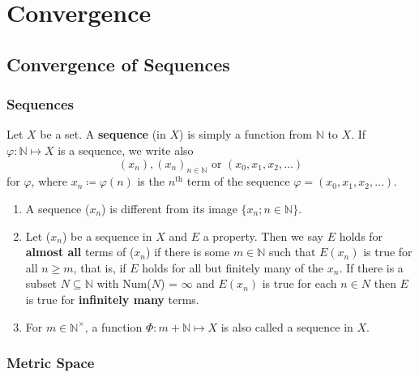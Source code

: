 \part{Convergence}
\chapter{Convergence of Sequences}

\section{Sequences}

\begin{definition}[Sequence]\label{def: sequence}
    Let \(X\) be a set. A \textbf{sequence} (in \(X\)) is simply a function from
    \(\mathbb{N}\) to \(X\). If \(\varphi \colon \mathbb{N} \mapsto X\) is a sequence,
    we write also
    \[
        (x_n), (x_n)_{n\in \mathbb{N}} \text{ or } (x_0,x_1,x_2,\ldots)  
    \]
    for \(\varphi\), where \(x_n \coloneqq \varphi\left(n\right)\) is the \(n^{\text{th}}\)
    term of the sequence \(\varphi = \left(x_0, x_1, x_2, \ldots\right)\). 
\end{definition}

\begin{remark}
    \begin{enumerate}[label = (\alph*)]
        \item A sequence (\(x_n\)) is different from its image \(\{x_n; n\in \mathbb{N}\}\).
        \item Let (\(x_n\)) be a sequence in \(X\) and \(E\) a property. Then we say 
        \(E\) holds for \textbf{almost all} terms of (\(x_n\)) if there is some \(m \in \mathbb{N}\)
        such that \(E\left(x_n\right)\) is true for all \(n \geq m\), that is, if \(E\) holds for 
        all but finitely many of the \(x_n\). If there is a subset \(N \subseteq \mathbb{N}\)
        with Num(\(N\)) = \(\infty\) and \(E\left(x_n\right)\) is true for each \(n \in N\)
        then \(E\) is true for \textbf{infinitely many} terms. 
        \item For \(m \in \mathbb{N}^\times\), a function \(\varPhi \colon m + \mathbb{N} \mapsto X\)
        is also called a sequence in \(X\). 
    \end{enumerate}
\end{remark}

\section{Metric Space}

